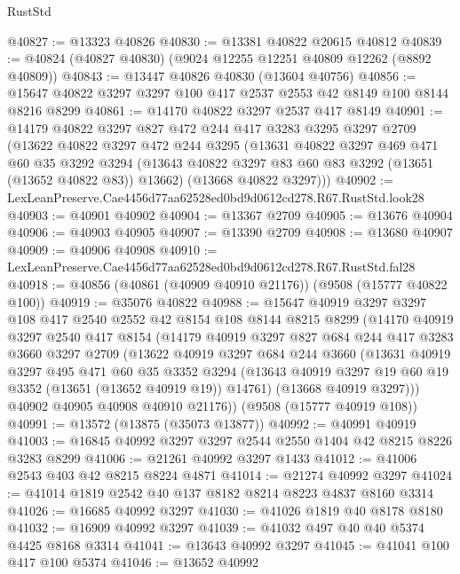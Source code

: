 \begin{lexlean}{RustStd}
\begin{coremodule}
@40827 := @13323 @40826
@40830 := @13381 @40822 @20615 @40812
@40839 := @40824 (@40827 @40830) (@9024 @12255 @12251 @40809 @12262 (@8892 @40809))
@40843 := @13447 @40826 @40830 (@13604 @40756)
@40856 := @15647 @40822 @3297 @3297 @100 @417 @2537 @2553 @42 @8149 @100 @8144 @8216 @8299
@40861 := @14170 @40822 @3297 @2537 @417 @8149
@40901 := @14179
    @40822
    @3297
    @827
    @472
    @244
    @417
    @3283
    @3295
    @3297
    @2709
    (@13622
      @40822
      @3297
      @472
      @244
      @3295
      (@13631
        @40822
        @3297
        @469
        @471
        @60
        @35
        @3292
        @3294
        (@13643 @40822 @3297 @83 @60 @83 @3292 (@13651 (@13652 @40822 @83)) @13662)
        (@13668 @40822 @3297)))
@40902 := LexLeanPreserve.Cae4456d77aa62528ed0bd9d0612cd278.R67.RustStd.look28
@40903 := @40901 @40902
@40904 := @13367 @2709
@40905 := @13676 @40904
@40906 := @40903 @40905
@40907 := @13390 @2709
@40908 := @13680 @40907
@40909 := @40906 @40908
@40910 := LexLeanPreserve.Cae4456d77aa62528ed0bd9d0612cd278.R67.RustStd.fal28
@40918 := @40856 (@40861 (@40909 @40910 @21176)) (@9508 (@15777 @40822 @100))
@40919 := @35076 @40822
@40988 := @15647
    @40919
    @3297
    @3297
    @108
    @417
    @2540
    @2552
    @42
    @8154
    @108
    @8144
    @8215
    @8299
    (@14170
      @40919
      @3297
      @2540
      @417
      @8154
      (@14179
        @40919
        @3297
        @827
        @684
        @244
        @417
        @3283
        @3660
        @3297
        @2709
        (@13622
          @40919
          @3297
          @684
          @244
          @3660
          (@13631
            @40919
            @3297
            @495
            @471
            @60
            @35
            @3352
            @3294
            (@13643 @40919 @3297 @19 @60 @19 @3352 (@13651 (@13652 @40919 @19)) @14761)
            (@13668 @40919 @3297)))
        @40902
        @40905
        @40908
        @40910
        @21176))
    (@9508 (@15777 @40919 @108))
@40991 := @13572 (@13875 (@35073 @13877))
@40992 := @40991 @40919
@41003 := @16845 @40992 @3297 @3297 @2544 @2550 @1404 @42 @8215 @8226 @3283 @8299
@41006 := @21261 @40992 @3297 @1433
@41012 := @41006 @2543 @403 @42 @8215 @8224 @4871
@41014 := @21274 @40992 @3297
@41024 := @41014 @1819 @2542 @40 @137 @8182 @8214 @8223 @4837 @8160 @3314
@41026 := @16685 @40992 @3297
@41030 := @41026 @1819 @40 @8178 @8180
@41032 := @16909 @40992 @3297
@41039 := @41032 @497 @40 @40 @5374 @4425 @8168 @3314
@41041 := @13643 @40992 @3297
@41045 := @41041 @100 @417 @100 @5374
@41046 := @13652 @40992

\end{coremodule}
\end{lexlean}
